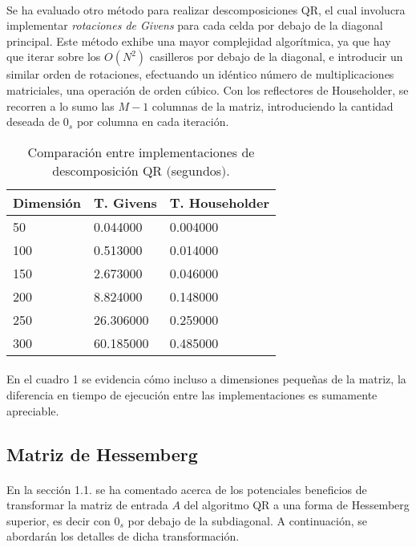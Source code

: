 \documentclass[12pt, twocolumn]{article}
\begin{document}
	\paragraph{} Se ha evaluado otro método para realizar descomposiciones QR, el cual involucra implementar \textit{rotaciones de Givens} para cada celda por debajo de la diagonal principal. Este método exhibe una mayor complejidad algorítmica, ya que hay que iterar sobre los $O(N^{2})$ casilleros por debajo de la diagonal, e introducir un similar orden de rotaciones, efectuando un idéntico número de multiplicaciones matriciales, una operación de orden cúbico. Con los reflectores de Householder, se recorren a lo sumo las $M-1$ columnas de la matriz, introduciendo la cantidad deseada de $0_{s}$ por columna en cada iteración.
	
	\begin{table}[h]
		\centering
		\label{my-label}
		\begin{tabular}{@{}lll@{}}
			\toprule
			Dimensión & T. Givens & T. Householder \\ \midrule
			50        & 0.044000  & 0.004000       \\
			100       & 0.513000  & 0.014000       \\
			150       & 2.673000  & 0.046000       \\
			200       & 8.824000  & 0.148000       \\
			250       & 26.306000 & 0.259000       \\
			300       & 60.185000 & 0.485000       \\ \bottomrule
		\end{tabular}
		\caption{Comparación entre implementaciones de descomposición QR $($segundos$)$.}
	\end{table}
	
	\paragraph{} En el cuadro 1 se evidencia cómo incluso a dimensiones pequeñas de la matriz, la diferencia en tiempo de ejecución entre las implementaciones es sumamente apreciable.
	
	\subsection{Matriz de Hessemberg}
	
	\paragraph{} En la sección 1.1. se ha comentado acerca de los potenciales beneficios de transformar la matriz de entrada $A$ del algoritmo QR a una forma de Hessemberg superior, es decir con $0_{s}$ por debajo de la subdiagonal. A continuación, se abordarán los detalles de dicha transformación.
	
\end{document}
